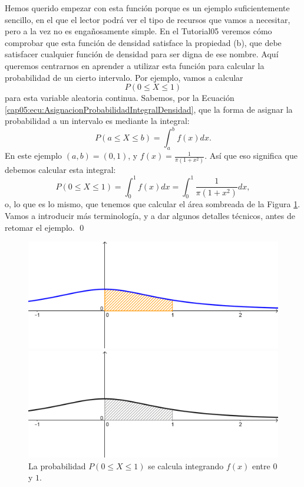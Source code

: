 \begin{ejemplo}
    Hemos querido empezar con esta función porque es un ejemplo suficientemente sencillo, en el que el lector podrá ver el tipo de recursos que vamos a necesitar, pero a la vez no es engañosamente simple. En el Tutorial05 veremos cómo comprobar que esta función de densidad satisface la propiedad (b), que debe satisfacer cualquier función de densidad para ser digna de ese nombre. Aquí queremos centrarnos en aprender a utilizar esta función para calcular la probabilidad de un cierto intervalo. Por ejemplo, vamos a calcular
    \[P(0\leq X\leq 1)\]
    para esta variable aleatoria continua. Sabemos, por la Ecuación \ref{cap05:ecu:AsignacionProbabilidadIntegralDensidad}, que la forma de asignar la probabilidad a un intervalo es mediante la integral:
    \[P(a\leq X\leq b)=\int_a^b f(x)dx.\]
    En este ejemplo $(a,b)=(0,1)$, y $f(x)=\frac{1}{\pi(1+x^2)}$. Así que eso significa que debemos calcular esta integral:
    \[
    P(0\leq X\leq 1)=\int_0^1f(x)dx=\int_0^1\dfrac{1}{\pi(1+x^2)}dx,
    \]
    o, lo que es lo mismo, que tenemos que calcular el área sombreada de la Figura \ref{cap05:fig:DistribucionCauchy-2}. Vamos a introducir más terminología, y a dar algunos detalles técnicos, antes de retomar el ejemplo.
    \qed

\begin{figure}[htbp]
\begin{center}
\begin{enColor}
\includegraphics[width=12cm]{../fig/Cap05-DistribucionCauchy-2.png}
\end{enColor}
\begin{bn}
\includegraphics[width=12cm]{../fig/Cap05-DistribucionCauchy-2-bn.png}
\end{bn}
\caption{La probabilidad $P(0\leq X\leq 1)$ se calcula integrando $f(x)$ entre $0$ y $1$.}
\label{cap05:fig:DistribucionCauchy-2}
\end{center}
\end{figure}

\end{ejemplo}
